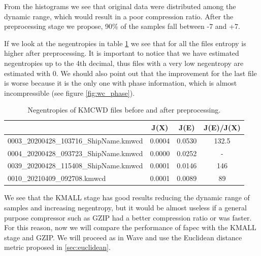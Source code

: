 From the histograms we see that original data were distributed among the dynamic range, which would result in a poor compression ratio. After the preprocessing stage we propose, 90\% of the samples fall between -7 and +7.

If we look at the negentropies in table \ref{tab:negentropies_kmall} we see that for all the files entropy is higher after preprocessing. It is important to notice that we have estimated negentropies up to the 4th decimal, thus files with a very low negentropy are estimated with 0. We should also point out that the improvement for the last file is worse because it is the only one with phase information, which is almost incompressible (see figure \ref{fig:wc_phase}).

\begin{table}[h!]
\normalsize
\centering
\begin{tabular}{|l|c|c|c|}
	\hline
	\rowcolor[HTML]{9698ED} 
	\multicolumn{1}{|c|}{\cellcolor[HTML]{9698ED}Filename}         & J(X)                           & J(E)                           & J(E)/J(X) \\ \hline
	\cellcolor[HTML]{FFFFFF}0003\_20200428\_103716\_ShipName.kmwcd & \cellcolor[HTML]{FFFFFF}0.0004 & \cellcolor[HTML]{FFFFFF}0.0530 & 132.5     \\ \hline
	\cellcolor[HTML]{FFFFFF}0004\_20200428\_093723\_ShipName.kmwcd & \cellcolor[HTML]{FFFFFF}0.0000      & \cellcolor[HTML]{FFFFFF}0.0252 & -         \\ \hline
	\cellcolor[HTML]{FFFFFF}0039\_20200428\_115408\_ShipName.kmwcd & \cellcolor[HTML]{FFFFFF}0.0001 & \cellcolor[HTML]{FFFFFF}0.0146 & 146       \\ \hline
	0010\_20210409\_092708.kmwcd                                   & 0.0001                         & 0.0089                         & 89        \\ \hline
\end{tabular}
\caption{Negentropies of KMCWD files before and after preprocessing.}
\label{tab:negentropies_kmall}
\end{table}

We see that the KMALL stage has good results reducing the dynamic range of samples and increasing negentropy, but it would be almost useless if a general purpose compressor such as GZIP had a better compression ratio or was faster. For this reason, now we will compare the performance of \acrshort{fapec} with the KMALL stage and GZIP. We will proceed as in Wave and use the Euclidean distance metric proposed in \ref{sec:euclidean}.

